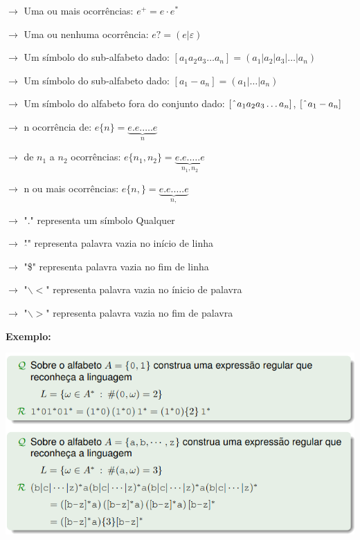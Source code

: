 \documentclass{article}
\begin{document}
\begin{flushleft}
    \item $\rightarrow$ Uma ou mais ocorrências: $e^+ = e \cdot e^*$
    \item $\rightarrow$ Uma ou nenhuma ocorrência: $e? = (e | \varepsilon)$
    \item $\rightarrow$ Um símbolo do sub-alfabeto dado: $[a_1a_2a_3 \dots a_n] = (a_1|a_2|a_3|\dots|a_n)$
    \item $\rightarrow$ Um símbolo do sub-alfabeto dado: $[a_1 - a_n] = (a_1 | \dots | a_n)$
    \item $\rightarrow$ Um símbolo do alfabeto fora do conjunto dado: $[\hspace{1mm}\hat{}\hspace{1mm} a_1a_2a_3 \dots a_n]$, $[\hspace{1mm}\hat{}\hspace{1mm} a_1 - a_n]$
    \item $\rightarrow$ n ocorrência de: $ e\{n\} = \underbrace{e . e . \dots . e}_n$
    \item $\rightarrow$ de $n_1$ a $n_2$ ocorrências: $e\{n_1,n_2\} = \underbrace{e . e . \dots . e}_{n_1, n_2}$
    \item $\rightarrow$ n ou mais ocorrências: $e\{n,\} = \underbrace{e . e . \dots . e}_{n,}$
    \item $\rightarrow$ "$.$" representa um símbolo Qualquer
    \item $\rightarrow$ "$\hat{}$" representa palavra vazia no início de linha
    \item $\rightarrow$ "\$" representa palavra vazia no fim de linha
    \item $\rightarrow$ "$\backslash <$" representa palavra vazia no ínicio de palavra
    \item $\rightarrow$ "$\backslash >$" representa palavra vazia no fim de palavra
    \break

    \textbf{Exemplo:}

    \begin{center}
      \includegraphics[scale=0.4]{4}
    \end{center}

\end{flushleft}
\end{document}
